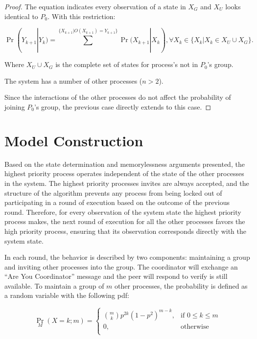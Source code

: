\begin{proof}
The equation indicates every observation of a state in $X_G$ and $X_U$ looks identical to $P_0$.
With this restriction:

\begin{equation}
\Pr(Y_{k+1} | Y_{k}) = \sum^{\{X_{k+1} | O(X_{k+1}) = Y_{k+1}\}} \Pr(X_{k+1} | X_{k}), \forall X_k \in \{X_k | X_k \in X_U \cup X_G\}.
\end{equation}

Where $X_U \cup X_G$ is the complete set of states for process's not in $P_0$'s group.

\begin{case}
    The system has a number of other processes ($n > 2$).
\end{case}

Since the interactions of the other processes do not affect the probability of joining $P_0$'s group, the previous case directly extends to this case.

\end{proof}

\section{Model Construction}

Based on the state determination and memorylessness arguments presented, the highest priority process operates independent of the state of the other processes in the system.
The highest priority processes invites are always accepted, and the structure of the algorithm prevents any process from being locked out of participating in a round of execution based on the outcome of the previous round.
Therefore, for every observation of the system state the highest priority process makes, the next round of execution for all the other processes favors the high priority process, ensuring that its observation corresponds directly with the system state.

In each round, the behavior is described by two components: maintaining a group and inviting other processes into the group.
The coordinator will exchange an ``Are You Coordinator'' message and the peer will respond to verify is still available.
To maintain a group of $m$ other processes, the probability is defined as a random variable with the following \ac{pdf}:

\begin{equation}
 \Pr_{M}(X=k; m) =
   \begin{cases}
    \binom{m}{k} p^{2k}(1-p^2)^{m-k}, & \text{if } 0 \leq k \leq m \\
    0,                                & \text{otherwise} \\
  \end{cases}
\end{equation}

